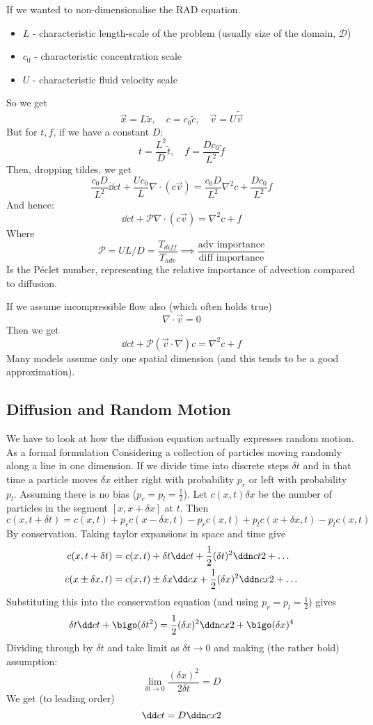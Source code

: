 \documentclass{X:/Documents/Coding/Latex/myassignment}
\begin{document}
If we wanted to non-dimensionalise the RAD equation.
\begin{itemize}
	\item $L$ - characteristic length-scale of the problem (usually size of the domain, $\mathcal{D}$)
	\item $c_0$ - characteristic concentration scale
	\item $U$ - characteristic fluid velocity scale
\end{itemize}
So we get
\[\vec x = L \tilde{x}, \quad c = c_0 \tilde{c}, \quad \vec v = U \tilde{\vec v}\]
But for $t, f$, if we have a constant $D$:
\[t =\frac{L^2}{D} \tilde{t}, \quad f = \frac{Dc_0}{L^2} \tilde{f}\]
Then, dropping tildes, we get
\[\frac{c_0 D}{L^2} \dd ct + \frac{Uc_0}{L} \nabla \cdot (c \vec v) = \frac{c_0D}{L^2} \nabla^2 c + \frac{Dc_0}{L^2}f\]
And hence:
\[\dd ct + \mathcal{P} \nabla \cdot(c\vec v) = \nabla^2 c + f\]
Where
\[\mathcal{P} = UL/D = \frac{T_{diff}}{T_{adv}} \implies \frac{\text{adv importance}}{\text{diff importance}}\]
Is the P\'eclet number, representing the relative importance of advection compared to diffusion. 

If we assume incompressible flow also (which often holds true)
\[\nabla \cdot \vec v = 0\]
Then we get
\[\dd ct + \mathcal{P}(\vec v\cdot \nabla)c =\nabla^2 c + f\]
Many models assume only one spatial dimension (and this tends to be a good approximation).

\subsection{Diffusion and Random Motion}
We have to look at how the diffusion equation actually expresses random motion.
As a formal formulation
Considering a collection of particles moving randomly along a line in one dimension. If we divide time into discrete steps $\delta t$ and in that time a particle moves $\delta x$ either right with probability $p_r$ or left with probability $p_l$. Assuming there is no bias ($p_r = p_l = \frac12$). Let $c(x,t) \delta x$ be the number of particles in the segment $[x,x+\delta x]$ at $t$. Then 
\[c(x,t+\delta t) = c(x,t) + p_r c(x-\delta x, t) - p_r c(x,t) + p_l c(x+ \delta x,t) - p_l c(x,t)\]
By conservation.
Taking taylor expansions in space and time give
\begin{align*}
	c(x,t+ \delta t) &= c(x,t) + \delta t \dd ct + \frac12 (\delta t)^2 \ddn ct2 + \ldots\\
	c(x \pm \delta x,t) &= c(x,t) \pm \delta x \dd cx + \frac12 (\delta x)^2 \ddn cx2 + \ldots\\
\end{align*}
Substituting this into the conservation equation (and using $p_r = p_l = \frac12$) gives
\[\delta t \dd ct + \bigo(\delta t^2) = \frac12 (\delta x)^2 \ddn cx2 + \bigo(\delta x)^4\]
Dividing through by $\delta t$ and take limit as $\delta t \to 0$ and making (the rather bold) assumption:
\[\lim_{\delta t \to 0} \frac{(\delta x)^2}{2 \delta t} = D\]
We get (to leading order)
\[\dd ct = D \ddn cx2\]
\end{document}
